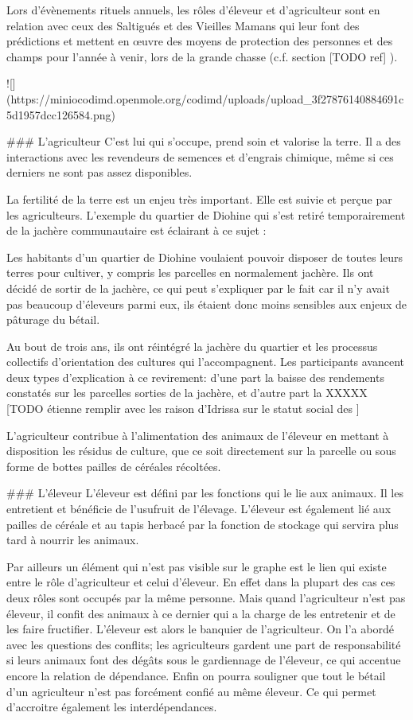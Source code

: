 Lors d'évènements rituels annuels, les rôles d'éleveur et d'agriculteur sont en relation avec ceux des Saltigués et des Vieilles Mamans qui leur font des prédictions et mettent en œuvre des moyens de protection des personnes et des champs pour l'année à venir, lors de la grande chasse (c.f. section [TODO ref] ). 

![](https://miniocodimd.openmole.org/codimd/uploads/upload_3f27876140884691c5d1957dcc126584.png)

### L'agriculteur
C'est lui qui s'occupe, prend soin et valorise la terre. Il a des interactions avec les revendeurs de semences et d'engrais chimique, même si ces derniers ne sont pas assez disponibles. 

La fertilité de la terre est un enjeu très important. Elle est suivie et perçue par les agriculteurs. L'exemple du quartier de Diohine qui s'est retiré temporairement de la jachère communautaire est éclairant à ce sujet :  

Les habitants d'un quartier de Diohine voulaient pouvoir disposer de toutes leurs terres pour cultiver, y compris les parcelles en normalement jachère. Ils ont décidé de sortir de la jachère, ce qui peut s'expliquer par le fait car il n'y avait pas beaucoup d'éleveurs parmi eux, ils étaient donc moins sensibles aux enjeux de pâturage du bétail. 

Au bout de trois ans, ils ont réintégré la jachère du quartier et les processus collectifs d'orientation des cultures qui l'accompagnent.
Les participants avancent deux types d'explication à ce revirement: d'une part la baisse des rendements constatés sur les parcelles sorties de la jachère, et d'autre part la XXXXX [TODO étienne remplir avec les raison d'Idrissa sur le statut social des ]


L'agriculteur contribue à l'alimentation des animaux de l'éleveur en mettant à disposition les résidus de culture, que ce soit directement sur la parcelle ou sous forme de bottes pailles de céréales récoltées. 

### L'éleveur
L'éleveur est défini par les fonctions qui le lie aux animaux. Il les entretient et bénéficie de l'usufruit de l'élevage. L'éleveur est également lié aux pailles de céréale et au tapis herbacé par la fonction de stockage qui servira plus tard à nourrir les animaux.

Par ailleurs un élément qui n'est pas visible sur le graphe est le lien qui existe entre le rôle d'agriculteur et celui d'éleveur. En effet dans la plupart des cas ces deux rôles sont occupés par la même personne. Mais quand l'agriculteur n'est pas éleveur, il confit des animaux à ce dernier qui a la charge de les entretenir et de les faire fructifier. L'éleveur est alors le banquier de l'agriculteur. On l'a abordé avec les questions des conflits; les agriculteurs gardent une part de responsabilité si leurs animaux font des dégâts sous le gardiennage de l'éleveur, ce qui accentue encore la relation de dépendance. Enfin on pourra souligner que tout le bétail d'un agriculteur n'est pas forcément confié au même éleveur. Ce qui permet d'accroitre également les interdépendances.

